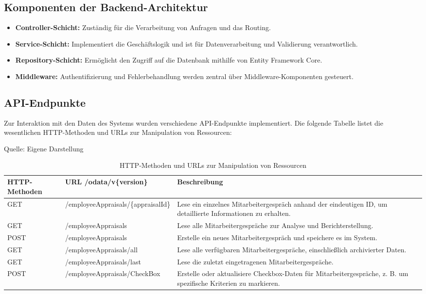 \subsection{Komponenten der Backend-Architektur}
\begin{itemize}
    \item \textbf{Controller-Schicht:} Zuständig für die Verarbeitung von Anfragen und das Routing.
    \item \textbf{Service-Schicht:} Implementiert die Geschäftslogik und ist für Datenverarbeitung und Validierung verantwortlich.
    \item \textbf{Repository-Schicht:} Ermöglicht den Zugriff auf die Datenbank mithilfe von Entity Framework Core.
    \item \textbf{Middleware:} Authentifizierung und Fehlerbehandlung werden zentral über Middleware-Komponenten gesteuert.
\end{itemize}

\subsection{API-Endpunkte}
Zur Interaktion mit den Daten des Systems wurden verschiedene API-Endpunkte implementiert. Die folgende Tabelle listet die wesentlichen HTTP-Methoden und URLs zur Manipulation von Ressourcen:

\begin{table}[H]
\caption{HTTP-Methoden und URLs zur Manipulation von Ressourcen}
\label{table:http-methods}
\raggedright
{\scriptsize Quelle: Eigene Darstellung} \\[0.3em]
\renewcommand{\arraystretch}{1.1} %
\setlength{\tabcolsep}{1.8pt} %
\begin{tabularx}{\textwidth}{>{\centering\arraybackslash}m{2cm}|>{\centering\arraybackslash}m{5.5cm}|>{\raggedright\arraybackslash}m{6.5cm}}
\hline
\textbf{HTTP-Methoden} & \textbf{URL /odata/v\{version\}} & \textbf{Beschreibung} \\ \hline
GET & /employeeAppraisals/\{appraisalId\} & Lese ein einzelnes Mitarbeitergespräch anhand der eindeutigen ID, um detaillierte Informationen zu erhalten. \\ \hline
GET & /employeeAppraisals & Lese alle Mitarbeitergespräche zur Analyse und Berichterstellung. \\ \hline
POST & /employeeAppraisals & Erstelle ein neues Mitarbeitergespräch und speichere es im System. \\ \hline
GET & /employeeAppraisals/all & Lese alle verfügbaren Mitarbeitergespräche, einschließlich archivierter Daten. \\ \hline
GET & /employeeAppraisals/last & Lese die zuletzt eingetragenen Mitarbeitergespräche. \\ \hline
POST & /employeeAppraisals/CheckBox & Erstelle oder aktualisiere Checkbox-Daten für Mitarbeitergespräche, z. B. um spezifische Kriterien zu markieren. \\ \hline
\end{tabularx}
\end{table}


